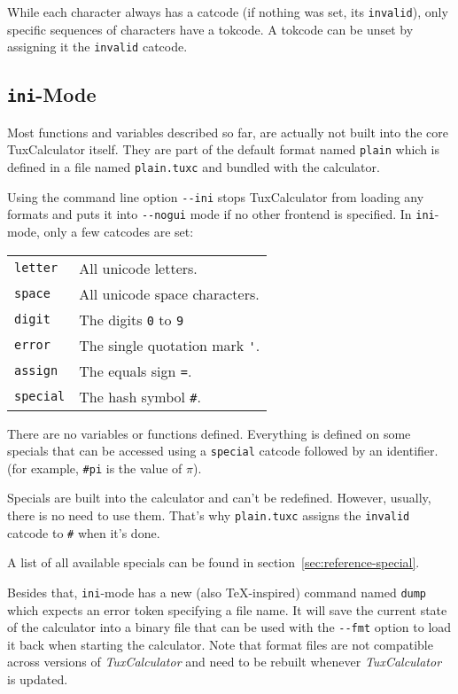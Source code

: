 \documentclass[10pt]{article}
\begin{document}
    While each character always has a catcode (if nothing was set, its \verb|invalid|), only specific sequences of characters have a tokcode.
    A tokcode can be unset by assigning it the \verb|invalid| catcode.
    
    \subsection{\texttt{ini}-Mode}\label{subsec:inimode}
    Most functions and variables described so far, are actually not built into the core TuxCalculator itself.
    They are part of the default format named \verb|plain| which is defined in a file named \verb|plain.tuxc| and bundled with the calculator.
    
    Using the command line option \verb|--ini| stops TuxCalculator from loading any formats and puts it into \verb|--nogui| mode if no other frontend is specified.
    In \texttt{ini}-mode, only a few catcodes are set:
    \begin{center}
        \begin{tabular}{p{}p{}}
            \verb|letter|  & All unicode letters.                \\
            \verb|space|   & All unicode space characters.       \\
            \verb|digit|   & The digits \verb|0| to \verb|9|     \\
            \verb|error|   & The single quotation mark \verb|'|. \\
            \verb|assign|  & The equals sign \verb|=|.           \\
            \verb|special| & The hash symbol \verb|#|.           \\
        \end{tabular}
    \end{center}
    There are no variables or functions defined.
    Everything is defined on some specials that can be accessed using a \verb|special| catcode followed by an identifier.
    (for example, \verb|#pi| is the value of $ \pi $).
    
    Specials are built into the calculator and can't be redefined.
    However, usually, there is no need to use them.
    That's why \verb|plain.tuxc| assigns the \verb|invalid| catcode to \verb|#| when it's done.
    
    A list of all available specials can be found in section~\ref{sec:reference-special}.
    
    Besides that, \verb|ini|-mode has a new (also \TeX-inspired) command named \verb|dump| which expects an error token specifying a file name.
    It will save the current state of the calculator into a binary file that can be used with the \verb|--fmt| option to load it back when starting the calculator.
    Note that format files are not compatible across versions of \textit{TuxCalculator} and need to be rebuilt whenever \textit{TuxCalculator} is updated.
    
\end{document}
